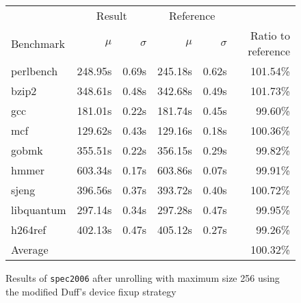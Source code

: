 \begin{figure}[th]
    \begin{center}
        \begin{tabular}{lrrrrr}
            \toprule
            & \multicolumn{2}{c}{Result} & \multicolumn{2}{c}{Reference}\\
            Benchmark & $\mu$ & $\sigma$ & $\mu$ & $\sigma$ & Ratio to reference\\
            \midrule
            perlbench & 248.95s & 0.69s & 245.18s & 0.62s & 101.54\%\\
            bzip2 & 348.61s & 0.48s & 342.68s & 0.49s & 101.73\%\\
            gcc & 181.01s & 0.22s & 181.74s & 0.45s & 99.60\%\\
            mcf & 129.62s & 0.43s & 129.16s & 0.18s & 100.36\%\\
            gobmk & 355.51s & 0.22s & 356.15s & 0.29s & 99.82\%\\
            hmmer & 603.34s & 0.17s & 603.86s & 0.07s & 99.91\%\\
            sjeng & 396.56s & 0.37s & 393.72s & 0.40s & 100.72\%\\
            libquantum & 297.14s & 0.34s & 297.28s & 0.47s & 99.95\%\\
            h264ref & 402.13s & 0.47s & 405.12s & 0.27s & 99.26\%\\
            \midrule
            Average & & & & & 100.32\%\\
            \bottomrule
        \end{tabular}
    \end{center}
    \caption{Results of \texttt{spec2006} after unrolling with maximum size 256 using the modified Duff's device fixup strategy}
    \label{fig:eval:perf:duff:256}
\end{figure}
